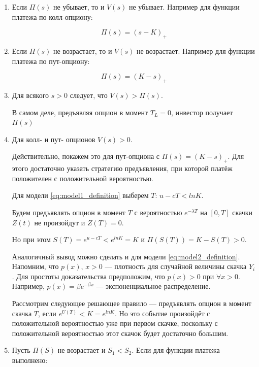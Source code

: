 \documentclass[a4paper,12pt]{article}
\theoremstyle{definition}
\begin{document}
\begin{enumerate}
    \item Если $\Pi (s)$ не убывает, то и $V(s)$ не убывает. Например для функции платежа по колл-опциону:
    
    \begin{equation*}
        \Pi (s) = (s - K)_{+}
    \end{equation*}
    
    \item Если $\Pi (s)$ не возрастает, то и $V(s)$ не возрастает. Например для функции платежа по пут-опциону:
    
    \begin{equation*}
        \Pi (s) = (K - s)_{+}
    \end{equation*}
    
    \item Для всякого $s > 0$ следует, что $V(s) > \Pi (s)$.
    
    В самом деле, предъявляя опцион в момент $T_L = 0$, инвестор получает $\Pi (s)$
    
    \item Для колл- и пут- опционов $V(s) > 0$.
    
    Действительно, покажем это для пут-опциона с $\Pi (s) = (K - s)_{+}$. Для этого достаточно указать стратегию предъявления, при которой платёж положителен с положительной вероятностью.
    
    Для модели \eqref{eq:model1_definition} выберем $T$: $u - c T < ln K$.
    
    Будем предъявлять опцион в момент $T$ с вероятностью $e^{-\lambda T}$ на $[0, T]$ скачки $Z(t)$ не произойдут и $Z(T) = 0$. 
    
    Но при этом $S(T) = e^{u - c T} < e^{ln K} = K$ и $\Pi (S(T)) = K - S(T) > 0$.
    
    Аналогичный вывод можно сделать и для модели \eqref{eq:model2_definition}. Напомним, что $p(x)$, $x > 0$ --- плотность для случайной величины скачка $Y_i$. Для простоты доказательства предположим, что $p (x) > 0$ при $\forall x > 0$. Например, $p(x) = \beta e^{-\beta x}$ --- экспоненциальное распределение.
    
    Рассмотрим следующее решающее правило --- предъявлять опцион в момент скачка $T$, если $e^{U(T)} < K = e^{ln K}$. Но это событие произойдёт с положительной вероятностью уже при первом скачке, поскольку с положительной вероятностью этот скачок будет достаточно большим.
    
    \item Пусть $\Pi (S)$ не возрастает и $S_1 < S_2$. Если для функции платежа выполнено:


\end{enumerate}
\end{document}
